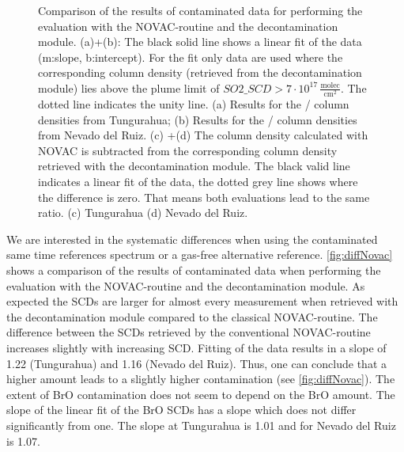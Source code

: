 \documentclass  [
  paper    = a4,
  BCOR     = 10mm,
  twoside,
  fontsize = 12pt,
  fleqn,
  toc      = bibnumbered,
  toc      = listofnumbered,
  numbers  = noendperiod,
  headings = normal,
  listof   = leveldown,
  version  = 3.03
]                                       {scrreprt}
\begin{document}
\begin{figure}[h!]
{		\label{fig:diffratiod}}
	\caption[Comparison of the results of contaminated data for performing the evaluation with the NOVAC-routine and the decontamination module. The results for the ratio of BrO/ are shown.]{Comparison of the results of contaminated data for performing the evaluation with the NOVAC-routine and the decontamination module.  (a)+(b): The black solid line shows a linear fit of the data (m:slope, b:intercept). For the fit only data are used where the corresponding   column density (retrieved from the decontamination module) lies above the plume limit of $SO2\_SCD>7\cdot 10^{17}\,\frac{\text{molec}}{\text{cm}^2}$. The dotted line indicates the unity line. (a) Results for the   /  column densities from Tungurahua; (b) Results for the /  column densities from Nevado del Ruiz. 
		(c) +(d) The column density calculated with NOVAC is subtracted from the corresponding column density retrieved with the decontamination module. The black valid line indicates a linear fit of the data, the dotted grey line shows where the difference is zero. That means both evaluations lead to the same ratio. (c) Tungurahua (d) Nevado del Ruiz. }
	\label{fig:diffratio}
\end{figure}
We are interested in the systematic differences when using the contaminated same time references spectrum or a gas-free alternative reference.  
\cref{fig:diffNovac} shows a comparison of the results of contaminated data when performing the evaluation with the NOVAC-routine and the decontamination module. 
As expected the  SCDs are larger for almost every measurement when retrieved with the decontamination module compared to the classical NOVAC-routine. The difference between the  SCDs retrieved by the conventional NOVAC-routine increases slightly with increasing  SCD. Fitting of the data results in a slope of 1.22 (Tungurahua) and 1.16 (Nevado del Ruiz). Thus, one can conclude that  a higher  amount leads to a slightly higher contamination (see \cref{fig:diffNovac}). The extent of BrO contamination does not seem to depend on the BrO amount. The slope of the linear fit of the BrO SCDs has a slope which does not differ significantly from one. The slope at Tungurahua is 1.01 and for Nevado del Ruiz is 1.07. \\
\end{document}
